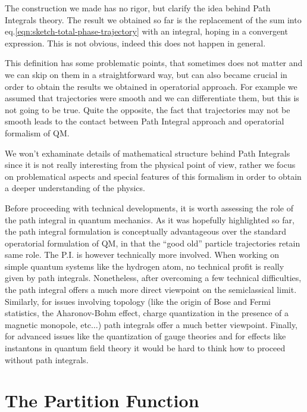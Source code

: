 \documentclass[../main/main.tex]{subfiles}
\begin{document}
The construction we made has no rigor, but clarify the idea behind Path Integrals theory. The result we obtained so far is the replacement of the sum into eq.\eqref{eqn:sketch-total-phase-trajectory} with an integral, hoping in a convergent expression. This is not obvious, indeed this does not happen in general. 

This definition has some problematic points, that sometimes does not matter and we can skip on them in a straightforward way, but can also became crucial in order to obtain the results we obtained in operatorial approach. For example we assumed that trajectories were smooth and we can differentiate them, but this is not going to be true. Quite the opposite, the fact that trajectories may not be smooth leads to the contact between Path Integral approach and operatorial formalism of QM. 

We won't exhaminate details of mathematical structure behind Path Integrals since it is not really interesting from the physical point of view, rather we focus on problematical aspects and special features of this formalism in order to obtain a deeper understanding of the physics. 

Before proceeding with technical developments, it is worth assessing the role of the path integral in quantum mechanics. As it was hopefully highlighted so far, the path integral formulation is conceptually advantageous over the standard operatorial formulation of QM, in that the ``good old'' particle trajectories retain same role. The P.I. is however technically more involved. When working on simple quantum systems like the hydrogen atom, no technical profit is really given by path integrals. Nonetheless, after overcoming a few technical difficulties, the path integral offers a much more direct viewpoint on the semiclassical limit. Similarly, for issues involving topology (like the origin of Bose and Fermi statistics, the Aharonov-Bohm effect, charge quantization in the presence of a magnetic monopole, etc$\dots$) path integrals offer a much better viewpoint. Finally, for advanced issues like the quantization of gauge theories and for effects like instantons in quantum field theory it would be hard to think how to proceed without path integrals.

\section{The Partition Function}
\end{document}
